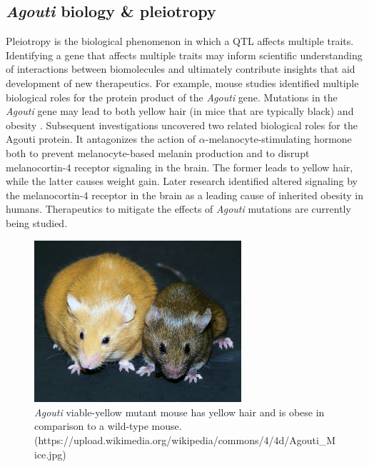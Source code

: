 \documentclass[oneside]{book}\usepackage[]{graphicx}\usepackage[]{color}
\begin{document}
\subsection{\emph{Agouti} biology \& pleiotropy}
Pleiotropy is the biological phenomenon in which a QTL affects multiple traits. 
Identifying a gene that affects multiple traits may inform scientific understanding of
interactions between biomolecules and ultimately contribute insights that aid development
of new therapeutics. 
For example, mouse studies identified multiple biological roles for the protein product of 
the \emph{Agouti} gene. Mutations in the \emph{Agouti} gene may lead to both 
yellow hair (in mice that are typically black) and obesity \citep{attie2017how}.
Subsequent investigations uncovered two related biological roles for the Agouti protein.
It antagonizes the action of $\alpha$-melanocyte-stimulating hormone both to
prevent melanocyte-based melanin production and to disrupt melanocortin-4
receptor signaling in the brain.
The former leads to yellow hair, while the latter causes weight gain.
Later research identified altered signaling by the melanocortin-4 receptor in
the brain as a leading cause of inherited obesity in humans.
Therapeutics to mitigate the effects of \emph{Agouti} mutations are currently being studied.


\begin{figure}
\includegraphics[height=6cm]{figs/Agouti.jpg}
\caption{\emph{Agouti} viable-yellow mutant mouse has yellow hair and is obese in comparison to a wild-type mouse. \tiny{(https://upload.wikimedia.org/wikipedia/commons/4/4d/Agouti\_Mice.jpg)}}
\label{fig:agouti}
\end{figure}







\end{document}
